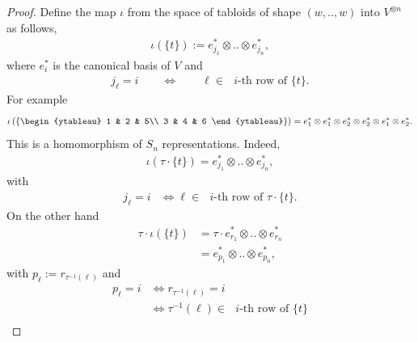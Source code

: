 \documentclass{scrartcl}
\theoremstyle{plain}
\theoremstyle{definition}
\newcommand{\1}[1]{1_{\{#1\}}}
\begin{document}
\begin{proof}
  Define the map $\iota$ from the space of tabloids of shape $(w,..,w)$ into $V^{\otimes n}$ as follows,
  \begin{align*}
    \iota( \{ t \} )
    :=
    e_{j_1}^* \otimes .. \otimes e_{j_n}^*,
  \end{align*}
  where $e_i^*$ is the canonical basis of $V$ and
  \begin{align*}
    j_\ell = i \qquad \Leftrightarrow \qquad \ell \in \text{ $i$-th row of } \{ t \}.
  \end{align*}
  For example
  \begin{align*}
    \iota\left(
      \left\{
        \begin{ytableau}
        1 & 2 & 5\\
        3 & 4 & 6
        \end{ytableau}
      \right\}
    \right)
    =
    e_1^* \otimes e_1^* \otimes e_2^* \otimes e_2^* \otimes e_1^* \otimes e_2^*.
  \end{align*}
  This is a homomorphism of $S_n$ representations.
  Indeed,
  \begin{align*}
    \iota( \tau \cdot \{t\} )
    =
    e_{j_1}^* \otimes .. \otimes e_{j_n}^*,
  \end{align*}
  with
  \begin{align*}
    j_\ell = i &\Leftrightarrow \ell \in \text{ $i$-th row of } \tau \cdot \{t\}.%
  \end{align*}
  On the other hand
  \begin{align*}
    \tau \cdot \iota( \{t\} )
    &=
    \tau \cdot e_{r_1}^* \otimes .. \otimes e_{r_n}^* \\
    &=
    e_{p_1}^* \otimes .. \otimes e_{p_n}^*,
  \end{align*}
  with $p_\ell := r_{\tau^{-1}(\ell)}$
  and
  \begin{align*}
    p_\ell = i &\Leftrightarrow r_{\tau^{-1}(\ell)} = i \\
               &\Leftrightarrow \tau^{-1}(\ell) \in \text{ $i$-th row of } \{t\} \\

\end{align*}
\end{proof}
\end{document}
